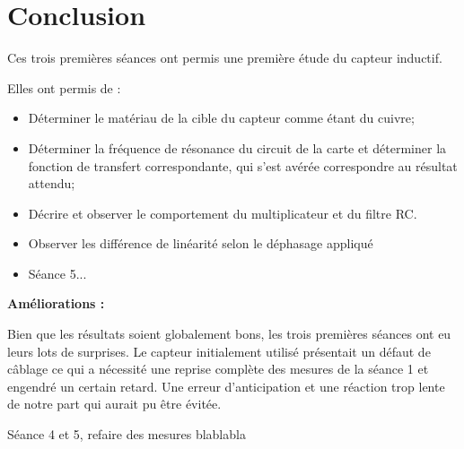 \newpage
\section{Conclusion}

Ces trois premières séances ont permis une première étude du capteur
inductif.

Elles ont permis de :

\begin{itemize}
    \item Déterminer le matériau de la cible du capteur comme étant du cuivre;
    \item Déterminer la fréquence de résonance du circuit de la carte et déterminer la fonction 
    de transfert correspondante, qui s'est avérée correspondre au résultat attendu; 
    \item Décrire et observer le comportement du multiplicateur et du filtre RC. 
    \item Observer les différence de linéarité selon le déphasage appliqué
    \item Séance 5...
\end{itemize}

\textbf{Améliorations :}

Bien que les résultats soient globalement bons, les trois premières séances ont eu leurs lots de surprises.
Le capteur initialement utilisé présentait un défaut de câblage ce qui a nécessité une reprise 
complète des mesures de la séance 1 et engendré un certain retard. Une erreur d'anticipation et  
une réaction trop lente de notre part qui aurait pu être évitée.


Séance 4 et 5, refaire des mesures blablabla
